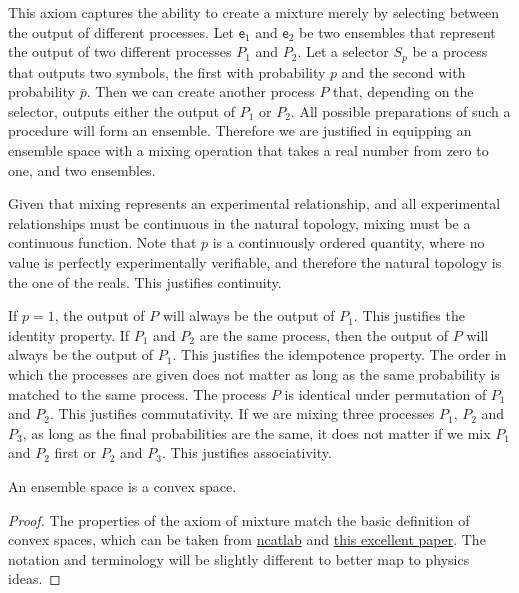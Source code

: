 \documentclass[10pt,twocolumn, nofootinbib]{revtex4-2}
\newcommand{\ens}[1][e] {\mathsf{#1}} %
\begin{document}
\begin{justification}
	This axiom captures the ability to create a mixture merely by selecting between the output of different processes. Let $\ens_1$ and $\ens_2$ be two ensembles that represent the output of two different processes $P_1$ and $P_2$. Let a selector $S_p$ be a process that outputs two symbols, the first with probability $p$ and the second with probability $\bar{p}$. Then we can create another process $P$ that, depending on the selector, outputs either the output of $P_1$ or $P_2$. All possible preparations of such a procedure will form an ensemble. Therefore we are justified in equipping an ensemble space with a mixing operation that takes a real number from zero to one, and two ensembles.
	
	Given that mixing represents an experimental relationship, and all experimental relationships must be continuous in the natural topology, mixing must be a continuous function. Note that $p$ is a continuously ordered quantity, where no value is perfectly experimentally verifiable, and therefore the natural topology is the one of the reals. This justifies continuity.

	If $p=1$, the output of $P$ will always be the output of $P_1$. This justifies the identity property. If $P_1$ and $P_2$ are the same process, then the output of $P$ will always be the output of $P_1$. This justifies the idempotence property. The order in which the processes are given does not matter as long as the same probability is matched to the same process. The process $P$ is identical under permutation of $P_1$ and $P_2$. This justifies commutativity. If we are mixing three processes $P_1$, $P_2$ and $P_3$, as long as the final probabilities are the same, it does not matter if we mix $P_1$ and $P_2$ first or $P_2$ and $P_3$. This justifies associativity.
\end{justification}

\begin{coro}
	An ensemble space is a convex space.
\end{coro}

\begin{proof}
	The properties of the axiom of mixture match the basic definition of convex spaces, which can be taken from \href{https://ncatlab.org/nlab/show/convex+space}{ncatlab} and \href{https://arxiv.org/abs/0903.5522}{this excellent paper}.  The notation and terminology will be slightly different to better map to physics ideas. 
\end{proof}
\end{document}
